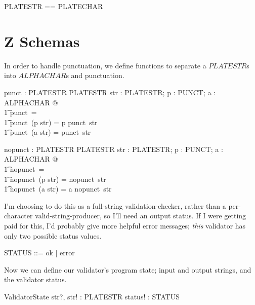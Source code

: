 \documentclass[11pt]{article}
\begin{document}
\begin{spec}
  \begin{zed}
    PLATESTR == \seq PLATECHAR
  \end{zed}



  \section{Z Schemas}

  In order to handle punctuation, we define functions to separate a $PLATESTR$s into $ALPHACHAR$s
  and punctuation.  

  \begin{axdef}
    punct : PLATESTR \fun PLATESTR
    \where
    \forall str : PLATESTR; p : PUNCT; a : ALPHACHAR @ \\
    \t1 punct~\langle \rangle = \langle \rangle \land \\
    \t1 punct~(\langle p \rangle \cat str) = \langle p \rangle \cat punct~str \land \\
    \t1 punct~(\langle a \rangle \cat str) = punct~str
  \end{axdef}

  \begin{axdef}
    nopunct : PLATESTR \fun PLATESTR
    \where
    \forall str : PLATESTR; p : PUNCT; a : ALPHACHAR  @ \\
    \t1 nopunct~\langle \rangle = \langle \rangle \land \\
    \t1 nopunct~(\langle p \rangle \cat str) = nopunct~str \land \\
    \t1 nopunct~(\langle a \rangle \cat str) = \langle a \rangle \cat nopunct~str
  \end{axdef}
  
  I'm choosing to do this as a full-string validation-checker, rather than a per-character
  valid-string-producer, so I'll need an output status.  If I were getting paid for this, I'd
  probably give more helpful error messages; \textit{this} validator has only two possible status
  values.

  \begin{zed}
    STATUS ::= ok | error
  \end{zed}

  Now we can define our validator's program state; input and output strings, and the validator
  status.

  \begin{schema}{ValidatorState}
    str?, str! : PLATESTR \also
    status! : STATUS
  \end{schema}


\end{spec}
\end{document}
